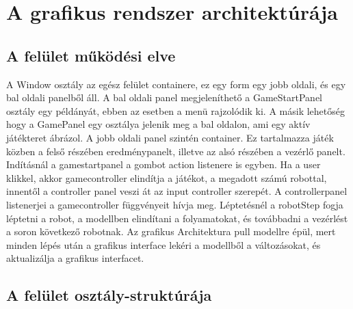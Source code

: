 \section{A grafikus rendszer architektúrája}

\subsection{A felület működési elve}
	A Window osztály az egész felület containere, ez egy form egy jobb oldali, és egy bal oldali panelből áll. A bal oldali panel megjeleníthető a GameStartPanel osztály egy példányát, ebben az esetben
	a menü rajzolódik ki. A másik lehetőség hogy a GamePanel egy osztálya jelenik meg a bal oldalon,
	ami egy aktív játékteret ábrázol.
	A jobb oldali panel szintén container. Ez tartalmazza játék közben a felső részében eredménypanelt, illetve az alsó részében a vezérlő panelt.
	Indításnál a gamestartpanel a gombot action listenere is egyben. Ha a user klikkel, akkor gamecontroller elindítja a játékot, a megadott számú robottal, innentől a controller panel veszi át az input controller szerepét. 
	A controllerpanel listenerjei a gamecontroller függvényeit hívja meg. Léptetésnél a robotStep fogja léptetni a robot, a modellben elindítani a folyamatokat, és továbbadni a vezérlést a soron következő robotnak.
	Az grafikus Architektura pull modellre épül, mert minden lépés után a grafikus interface lekéri a modellből a változásokat, és aktualizálja a grafikus interfacet.
	\clearpage
\subsection{A felület osztály-struktúrája}


